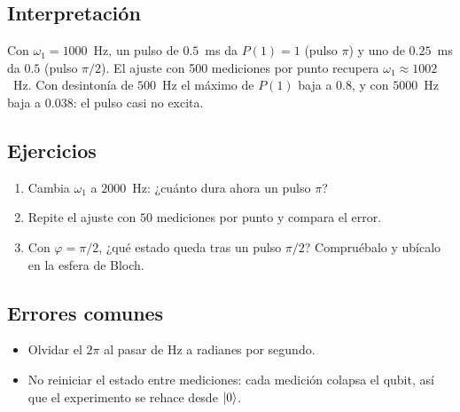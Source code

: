 \subsection{Interpretación}
Con $\omega_1=1000$~Hz, un pulso de $0.5$~ms da $P(1)=1$ (pulso $\pi$) y uno de
$0.25$~ms da $0.5$ (pulso $\pi/2$). El ajuste con 500 mediciones por punto
recupera $\omega_1\approx1002$~Hz. Con desintonía de $500$~Hz el máximo de
$P(1)$ baja a $0.8$, y con $5000$~Hz baja a $0.038$: el pulso casi no excita.

\subsection{Ejercicios}
\begin{enumerate}
  \item Cambia $\omega_1$ a $2000$~Hz: ¿cuánto dura ahora un pulso $\pi$?
  \item Repite el ajuste con $50$ mediciones por punto y compara el error.
  \item Con $\varphi=\pi/2$, ¿qué estado queda tras un pulso $\pi/2$?
    Compruébalo y ubícalo en la esfera de Bloch.
\end{enumerate}

\subsection{Errores comunes}
\begin{itemize}
  \item Olvidar el $2\pi$ al pasar de Hz a radianes por segundo.
  \item No reiniciar el estado entre mediciones: cada medición colapsa el
    qubit, así que el experimento se rehace desde $\left|0\right\rangle$.
\end{itemize}


